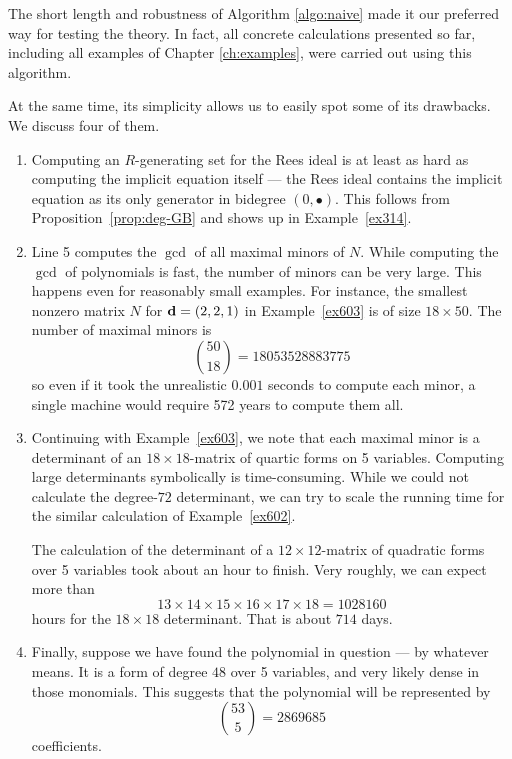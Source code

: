\documentclass[fleqn,reqno]{amsart}
\numberwithin{first}{chapter}
\begin{document}
\begin{paragraf}
\label{par:flaws}
The short length and robustness of Algorithm \ref{algo:naive} made it our preferred way
for testing the theory.
In fact, all concrete calculations presented so far,
including all examples of Chapter \ref{ch:examples},
were carried out using this algorithm.

At the same time, its simplicity allows us to easily spot some of its drawbacks.
We discuss four of them.
\begin{enumerate}
\item
\label{itm:flaws:GB}
Computing an $R$-generating set for the Rees ideal is at least as hard as
computing the implicit equation itself ---
the Rees ideal contains the implicit equation as its only generator in bidegree $(0,\bullet)$.
This follows from Proposition~\ref{prop:deg-GB} and shows up in Example~\ref{ex314}.

\item
\label{itm:flaws:many-minors}
Line 5 computes the $\gcd$ of all maximal minors of $N$.
While computing the $\gcd$ of polynomials is fast,
the number of minors can be very large.
This happens even for reasonably small examples.
For instance, the smallest nonzero matrix $N$ for $\mathbf d=(2,2,1)$ in Example~\ref{ex603}
is of size $18\times50$.
The number of maximal minors is
\[
	\binom{50}{18}=18053528883775
\]
so even if it took the unrealistic $0.001$ seconds to compute each minor,
a single machine would require 572 years to compute them all.

\item
\label{itm:flaws:large-det}
Continuing with Example~\ref{ex603},
we note that each maximal minor is a determinant of an $18\times18$-matrix
of quartic forms on 5 variables.
Computing large determinants symbolically is time-consuming.
While we could not calculate the degree-$72$ determinant,
we can try to scale the running time for the similar calculation
of Example~\ref{ex602}.

The calculation of the determinant of a $12\times12$-matrix of quadratic forms
over 5 variables took about an hour to finish.
Very roughly, we can expect more than
\[
	13\times14\times15\times16\times17\times18=1028160
\]
hours for the $18\times18$ determinant.
That is about $714$ days.

\item
\label{itm:flaws:large-poly}
Finally, suppose we have found the polynomial in question --- by whatever means.
It is a form of degree $48$ over 5 variables, and very likely dense in those monomials.
This suggests that the polynomial will be represented by
\[
	\binom{53}{5}=2869685
\]
coefficients.
\end{enumerate}
\end{paragraf}
\end{document}
